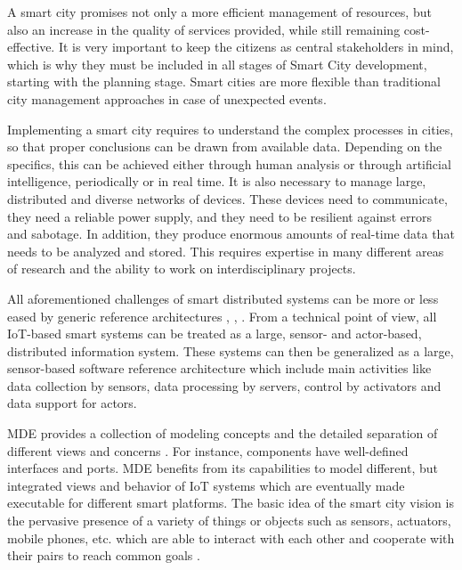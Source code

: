 A smart city promises not only a more efficient management of resources, but also an increase in the quality of services provided, while still remaining cost-effective. It is very important to keep the citizens as central stakeholders in mind, which is why they must be included in all stages of Smart City development, starting with the planning stage. Smart cities are more flexible than traditional city management approaches in case of unexpected events.

Implementing a smart city requires to understand the complex processes in cities, so that proper conclusions can be drawn from available data. Depending on the specifics, this can be achieved either through human analysis or through artificial intelligence, periodically or in real time. It is also necessary to manage large, distributed and diverse networks of devices. These devices need to communicate, they need a reliable power supply, and they need to be resilient against errors and sabotage. In addition, they produce enormous amounts of real-time data that needs to be analyzed and stored. This requires expertise in many different areas of research and the ability to work on interdisciplinary projects.

All aforementioned challenges of smart distributed systems can be more or less eased by generic reference architectures \cite{Fleurey+2011}, \cite{Gubbi+2013}, \cite{KateuleWinter2018}. From a technical point of view, all IoT-based smart systems can be treated as a large, sensor- and actor-based, distributed information system. These systems can then be generalized as a large, sensor-based software reference architecture \cite{KateuleWinter2018} which include main activities like data collection by sensors, data processing by servers, control by activators and data support for actors.

MDE provides a collection of modeling concepts and the detailed separation of different views and concerns \cite{KateuleWinter2018}. For instance, components have well-defined interfaces and ports. MDE benefits from its capabilities to model different, but integrated views and behavior of IoT systems which are eventually made executable for different smart platforms. The basic idea of the smart city vision is the pervasive presence of a variety of things or objects such as sensors, actuators, mobile phones, etc. which are able to interact with each other and cooperate with their pairs to reach common goals \cite{Atzori+2010} \cite{WeberRomana2010}.